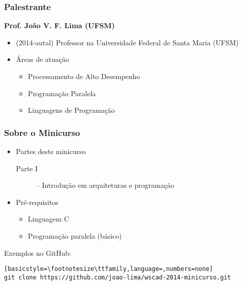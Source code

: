 

\begin{frame}
  \frametitle{Palestrante}
  {\bf Prof. João V. F. Lima (UFSM)}
  \begin{itemize}
  \item (2014-autal) Professor na Universidade Federal de Santa Maria (UFSM)
  \item Áreas de atuação
    \begin{itemize}
    \item Processamento de Alto Desempenho
    \item Programação Paralela
    \item Linguagens de Programação
    \end{itemize}
  \end{itemize}
\end{frame}
\begin{frame}[fragile]
  \frametitle{Sobre o Minicurso}
  \begin{itemize}
  \item Partes deste minicurso
    \begin{description}
    \item[Parte I] -- Introdução em arquiteturas e programação
    \end{description}
  \item Pré-requisitos
    \begin{itemize}
    \item Linguagem C
    \item Programação paralela (básico)
    \end{itemize}
  \end{itemize}
  \begin{block}{Exemplos no GitHub:}
\begin{lstlisting}[basicstyle=\footnotesize\ttfamily,language=,numbers=none]
git clone https://github.com/joao-lima/wscad-2014-minicurso.git
\end{lstlisting}
  \end{block}
\end{frame}
